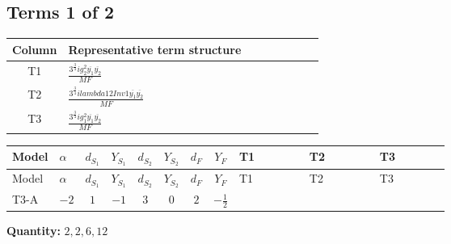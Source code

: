 \documentclass[8pt]{article}
\begin{document}
\begin{landscape}
\subsection*{Terms 1 of 2}
\begin{center}
\begin{tabular}{@{}c >{\raggedright\arraybackslash}p{0.82\linewidth}@{}}
\toprule
Column & Representative term structure \\
\midrule
T1 & \(\displaystyle \frac{3^{\frac{3}{4}} i g_{2}^{2} \overline{y_{1}} \overline{y_{2}}}{MF}\) \\
\midrule
T2 & \(\displaystyle \frac{3^{\frac{3}{4}} i lambda12Inv1 \overline{y_{1}} \overline{y_{2}}}{MF}\) \\
\midrule
T3 & \(\displaystyle \frac{3^{\frac{3}{4}} i g_{1}^{2} \overline{y_{1}} \overline{y_{2}}}{MF}\) \\
\midrule
\bottomrule
\end{tabular}
\end{center}
\smallskip
\tiny
\begin{longtable}{@{}llcccccc >{\raggedright\arraybackslash}p{0.21\linewidth} >{\raggedright\arraybackslash}p{0.21\linewidth} >{\raggedright\arraybackslash}p{0.21\linewidth}@{}}
\toprule
Model & $\alpha$ & $d_{S_1}$ & $Y_{S_1}$ & $d_{S_2}$ & $Y_{S_2}$ & $d_F$ & $Y_F$ & T1 & T2 & T3 \\
\midrule
\endfirsthead
\toprule
Model & $\alpha$ & $d_{S_1}$ & $Y_{S_1}$ & $d_{S_2}$ & $Y_{S_2}$ & $d_F$ & $Y_F$ & T1 & T2 & T3 \\
\midrule
\endhead
T3-A & $-2$ & $1$ & $-1$ & $3$ & $0$ & $2$ & $-\frac{1}{2}$ & \scriptsize\adjustbox{max width=\linewidth}{$\begin{gathered} - \frac{11 \cdot 3^{\frac{3}{4}} i g_{2}^{2} \overline{y_{1}} \overline{y_{2}}}{8 MF}\end{gathered}$} & \scriptsize\adjustbox{max width=\linewidth}{$\begin{gathered} - \frac{3^{\frac{3}{4}} i lambda12Inv1 \overline{y_{1}} \overline{y_{2}}}{6 MF}\end{gathered}$} & \scriptsize\adjustbox{max width=\linewidth}{$\begin{gathered} - \frac{3^{\frac{3}{4}} i g_{1}^{2} \overline{y_{1}} \overline{y_{2}}}{8 MF}\end{gathered}$} \\
\midrule
\bottomrule
\end{longtable}
\clearpage
\noindent\textbf{Quantity: }$\mathrm{2,2,6,12}$\par\smallskip

\end{landscape}
\end{document}

